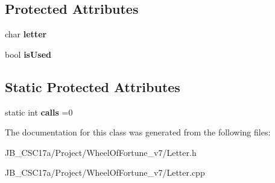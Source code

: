 \subsection*{Protected Attributes}
\begin{DoxyCompactItemize}
\item 
\hypertarget{class_letter_add29e231aa209f890a891ea202dbff4a}{}\label{class_letter_add29e231aa209f890a891ea202dbff4a} 
char {\bfseries letter}
\item 
\hypertarget{class_letter_ad1996ff2106ebfad001df34fd2484a0a}{}\label{class_letter_ad1996ff2106ebfad001df34fd2484a0a} 
bool {\bfseries is\+Used}
\end{DoxyCompactItemize}
\subsection*{Static Protected Attributes}
\begin{DoxyCompactItemize}
\item 
\hypertarget{class_letter_a8cb651b8860e525ee90780e5915d9955}{}\label{class_letter_a8cb651b8860e525ee90780e5915d9955} 
static int {\bfseries calls} =0
\end{DoxyCompactItemize}


The documentation for this class was generated from the following files\+:\begin{DoxyCompactItemize}
\item 
J\+B\+\_\+\+C\+S\+C17a/\+Project/\+Wheel\+Of\+Fortune\+\_\+v7/Letter.\+h\item 
J\+B\+\_\+\+C\+S\+C17a/\+Project/\+Wheel\+Of\+Fortune\+\_\+v7/Letter.\+cpp\end{DoxyCompactItemize}
